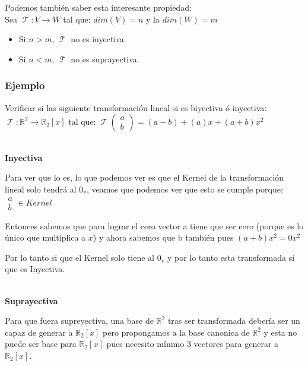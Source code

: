 \documentclass[12pt]{report}                                    %
\DeclareMathOperator \LinealTransformation {\mathcal{T}}
\begin{document}
        Podemos también saber esta interesante propiedad:\\
        Sea $\LinealTransformation: V \to W$ tal que: $dim(V) = n$ y la $dim(W)=m$
        \begin{itemize}
            \item Si $n > m$, $\LinealTransformation$ no es inyectiva.
            \item Si $n < m$, $\LinealTransformation$ no es suprayectiva.
        \end{itemize}


            \clearpage
            \subsubsection{Ejemplo}
            Verificar si las siguiente transformación lineal si es biyectiva ó inyectiva:
            $\LinealTransformation : \mathbb{R}^2 \to \mathbb{R}_2[x]$ tal que: 
            $\LinealTransformation(\begin{matrix}a\\b\end{matrix}) = (a-b) + (a)x + (a+b)x^2$

            \textbf{\\Inyectiva}

            Para ver que lo es, lo que podemos ver es que el Kernel de la transformación lineal
            solo tendrá al $0_v$, veamos que podemos ver que esto se cumple porque:
            $\begin{matrix}a\\b\end{matrix} \in Kernel$

            Entonces sabemos que para lograr el cero vector a tiene que ser cero (porque es lo 
            único que multiplica a $x$) y ahora sabemos que b también pues $(a+b)x^2=0x^2$

            Por lo tanto si que el Kernel solo tiene al $0_v$ y por lo tanto esta transformada si que es Inyectiva.


            \textbf{\\Suprayectiva}

            Para que fuera supreyectiva, una base de $\mathbb{R}^2$ tras ser transformada debería ser un capaz de
            generar a $\mathbb{R}_2[x]$ pero propongamos a la base canonica de  $ \mathbb{R}^2$ y esta no puede
            ser base para $\mathbb{R}_2[x]$ pues necesito mínimo 3 vectores para generar a $\mathbb{R}_2[x]$.
\end{document}
